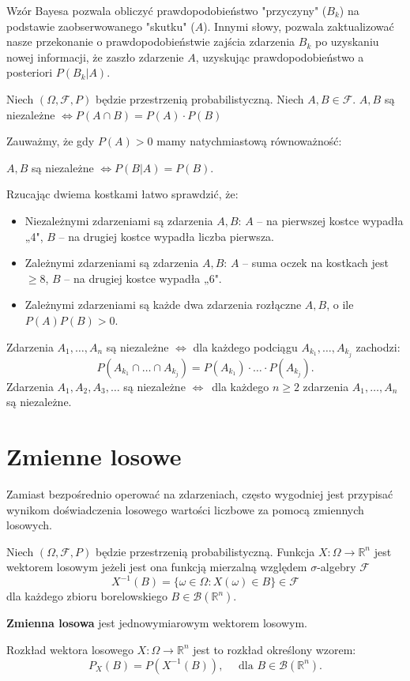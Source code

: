 \documentclass[final,a4paper,openany,12pt]{mwbk}
\begin{document}
Wzór Bayesa pozwala obliczyć prawdopodobieństwo "przyczyny" ($B_k$) na podstawie zaobserwowanego "skutku" ($A$). Innymi słowy, pozwala zaktualizować nasze przekonanie o prawdopodobieństwie zajścia zdarzenia $B_k$ po uzyskaniu nowej informacji, że zaszło zdarzenie $A$, uzyskując prawdopodobieństwo a posteriori $P(B_k|A)$.

\begin{Def}
Niech $(\Omega, \mathcal{F}, P)$ będzie przestrzenią probabilistyczną. Niech $A, B \in \mathcal{F}$. 
$A, B$ są niezależne $\iff P(A \cap B) = P(A) \cdot P(B) $
\end{Def}

Zauważmy, że gdy $P(A) > 0$ mamy natychmiastową równoważność:
\begin{center}
$A, B$ są niezależne $\iff P(B|A) = P(B)$.
\end{center}

\begin{Prz}
    Rzucając dwiema kostkami łatwo sprawdzić, że:
\begin{itemize}
    \item Niezależnymi zdarzeniami są zdarzenia $A, B$: $A$ – na pierwszej kostce wypadła „4", $B$ – na drugiej kostce wypadła liczba pierwsza.
    \item Zależnymi zdarzeniami są zdarzenia $A, B$: $A$ – suma oczek na kostkach jest $\ge 8$, $B$ – na drugiej kostce wypadła „6".
    \item Zależnymi zdarzeniami są każde dwa zdarzenia rozłączne $A, B$, o ile $P(A)P(B) > 0$.
\end{itemize}
\end{Prz}

\begin{Def}
 Zdarzenia $A_1, \dots, A_n$ są niezależne $\iff$ dla każdego podciągu $A_{k_1}, \dots, A_{k_j}$ zachodzi:
\[ P(A_{k_1} \cap \dots \cap A_{k_j}) = P(A_{k_1}) \cdot \dots \cdot P(A_{k_j}). \]
Zdarzenia $A_1, A_2, A_3, \dots$ są niezależne $\iff$\ dla każdego $n \ge 2$ zdarzenia $A_1, \dots, A_n$ są niezależne. 
\end{Def}

\section{Zmienne losowe}
Zamiast bezpośrednio operować na zdarzeniach, często wygodniej jest przypisać wynikom doświadczenia losowego wartości liczbowe za pomocą zmiennych losowych.

\begin{Def}
Niech $(\Omega, \mathcal{F}, P)$ będzie przestrzenią probabilistyczną. 
Funkcja $X \colon \Omega \longrightarrow \mathbb{R}^n$ jest wektorem losowym jeżeli jest ona funkcją mierzalną względem $\sigma$-algebry $\mathcal{F}$
\[
X^{-1}(B) = \{\omega \in \Omega : X(\omega) \in B\} \in \mathcal{F}
\]
dla każdego zbioru borelowskiego $B \in \mathcal{B}(\mathbb{R}^n)$.
\par\noindent
\textbf{Zmienna losowa} jest jednowymiarowym wektorem losowym.
\end{Def}

\begin{Def}
    Rozkład wektora losowego $X \colon \Omega \longrightarrow \mathbb{R}^n$ jest to rozkład określony wzorem:
\[
P_X(B) = P(X^{-1}(B)), \quad \text{ dla } B \in \mathcal{B}(\mathbb{R}^n).
\]
\end{Def}



\printbibliography
\end{document}
